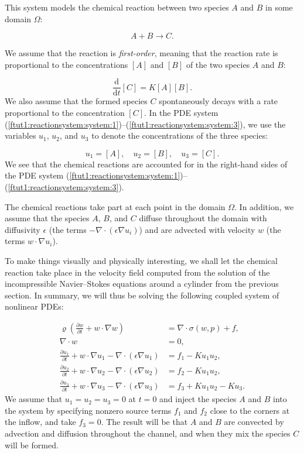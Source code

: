 \documentclass[graybox,envcountchap,sectrefs,final]{svmonodo}
\begin{document}
This system models the chemical reaction between two species $A$ and
$B$ in some domain $\Omega$:

\[
  A + B \rightarrow C.
\]

We assume that the reaction is \emph{first-order}, meaning that the
reaction rate is proportional to the concentrations $[A]$ and $[B]$ of
the two species $A$ and $B$:

\[
  \frac{\mathrm{d}}{\mathrm{d}t} [C] = K [A] [B].
\]
We also assume that the formed species $C$ spontaneously decays with a
rate proportional to the concentration $[C]$. In the PDE system
(\ref{ftut1:reactionsystem:system:1})--(\ref{ftut1:reactionsystem:system:3}),
we use the variables $u_1$, $u_2$, and $u_3$ to denote the
concentrations of the three species:

\[
  u_1 = [A], \quad u_2 = [B], \quad u_3 = [C].
\]
We see that the chemical reactions are accounted for in the
right-hand sides of the PDE system (\ref{ftut1:reactionsystem:system:1})--(\ref{ftut1:reactionsystem:system:3}).

The chemical reactions take part at each point in the domain
$\Omega$. In addition, we assume that the species $A$, $B$, and $C$
diffuse throughout the domain with diffusivity $\epsilon$ (the terms
$-\nabla\cdot(\epsilon\nabla u_i)$) and are advected with velocity
$w$ (the terms $w\cdot\nabla u_i$).

To make things visually and physically interesting, we shall let the
chemical reaction take place in the velocity field computed from the
solution of the incompressible Navier--Stokes equations around a
cylinder from the previous section. In summary, we will thus be
solving the following coupled system of nonlinear PDEs:

\begin{align}
  \label{ftut1:reactionsystem:full}
  \varrho\left(\frac{\partial w}{\partial t} +
  w \cdot \nabla w\right) &= \nabla\cdot\sigma(w, p) + f, \\
  \nabla \cdot w &= 0, \\
  \frac{\partial u_1}{\partial t} +
  w \cdot \nabla u_1 - \nabla\cdot(\epsilon\nabla u_1)
    &= f_1 - K u_1 u_2, \\
  \frac{\partial u_2}{\partial t} +
  w \cdot \nabla u_2 - \nabla\cdot(\epsilon\nabla u_2)
    &= f_2 - K u_1 u_2, \\
  \frac{\partial u_3}{\partial t} +
  w \cdot \nabla u_3 - \nabla\cdot(\epsilon\nabla u_3)
    &= f_3 + K u_1 u_2 - K u_3.
\end{align}
We assume that $u_1 = u_2 = u_3 = 0$ at $t = 0$ and inject the species
$A$ and $B$ into the system by specifying nonzero source terms $f_1$
and $f_2$ close to the corners at the inflow, and take $f_3 = 0$. The
result will be that $A$ and $B$ are convected by advection and
diffusion throughout the channel, and when they mix the species $C$
will be formed.
\end{document}
